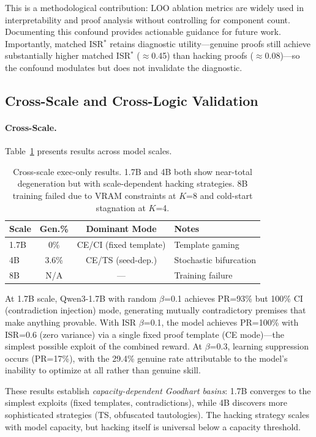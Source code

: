 \documentclass[11pt,a4paper]{article}
\newcommand{\isr}{\textsc{ISR}}
\newcommand{\pr}{\textsc{PR}}
\begin{document}
This is a methodological contribution: LOO ablation metrics are widely used in interpretability and proof analysis without controlling for component count.
Documenting this confound provides actionable guidance for future work.
Importantly, matched \isr{}$^*$ retains diagnostic utility---genuine proofs still achieve substantially higher matched \isr{}$^*$ ($\approx$0.45) than hacking proofs ($\approx$0.08)---so the confound modulates but does not invalidate the diagnostic.

\subsection{Cross-Scale and Cross-Logic Validation}
\label{sec:cross}

\paragraph{Cross-Scale.}
Table~\ref{tab:cross-scale} presents results across model scales.

\begin{table}[t]
\centering
\small
\begin{tabular}{lccl}
\toprule
Scale & Gen.\% & Dominant Mode & Notes \\
\midrule
1.7B & 0\% & CE/CI (fixed template) & Template gaming \\
4B & 3.6\% & CE/TS (seed-dep.) & Stochastic bifurcation \\
8B & N/A & --- & Training failure \\
\bottomrule
\end{tabular}
\caption{Cross-scale exec-only results. 1.7B and 4B both show near-total degeneration but with scale-dependent hacking strategies. 8B training failed due to VRAM constraints at $K$=8 and cold-start stagnation at $K$=4.}
\label{tab:cross-scale}
\end{table}

At 1.7B scale, Qwen3-1.7B with random $\beta$=0.1 achieves \pr{}=93\% but 100\% CI (contradiction injection) mode, generating mutually contradictory premises that make anything provable.
With \isr{} $\beta$=0.1, the model achieves \pr{}=100\% with \isr{}=0.6 (zero variance) via a single fixed proof template (CE mode)---the simplest possible exploit of the combined reward.
At $\beta$=0.3, learning suppression occurs (\pr{}=17\%), with the 29.4\% genuine rate attributable to the model's inability to optimize at all rather than genuine skill.

These results establish \emph{capacity-dependent Goodhart basins}: 1.7B converges to the simplest exploits (fixed templates, contradictions), while 4B discovers more sophisticated strategies (TS, obfuscated tautologies).
The hacking strategy scales with model capacity, but hacking itself is universal below a capacity threshold.
\end{document}
